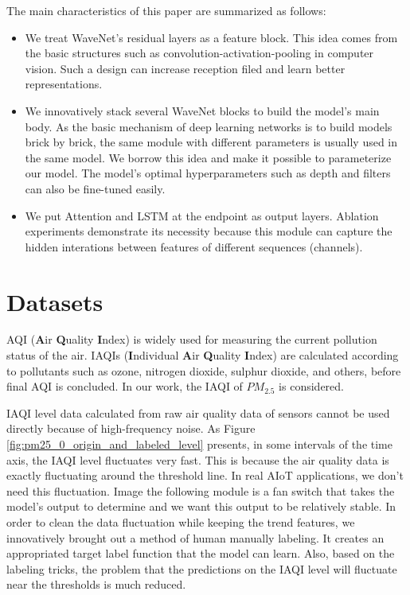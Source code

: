 \documentclass[sigconf]{acmart}
\begin{document}
The main characteristics of this paper are summarized as follows:
\begin{itemize}
\item We treat WaveNet's residual layers as a feature block. This idea comes from the basic structures such as convolution-activation-pooling in computer vision. Such a design can increase reception filed and learn better representations.
\item We innovatively stack several WaveNet blocks to build the model's main body. As the basic mechanism of deep learning networks is to build models brick by brick, the same module with different parameters is usually used in the same model. We borrow this idea and make it possible to parameterize our model. The model's optimal hyperparameters such as depth and filters can also be fine-tuned easily.
\item We put Attention \cite{bahdanau2014neural} and LSTM \cite{hochreiter1997long} at the endpoint as output layers. Ablation experiments demonstrate its necessity because this module can capture the hidden interations between features of different sequences (channels).
\end{itemize}


\section{Datasets}\label{sec:data_modeling}

AQI (\textbf{A}ir \textbf{Q}uality \textbf{I}ndex) is widely used for measuring the current pollution status of the air. IAQIs (\textbf{I}ndividual \textbf{A}ir \textbf{Q}uality \textbf{I}ndex) are calculated according to pollutants such as ozone, nitrogen dioxide, sulphur dioxide, and others, before final AQI is concluded. In our work, the IAQI of $PM_{2.5}$ is considered.

IAQI level data calculated from raw air quality data of sensors cannot be used directly because of high-frequency noise. As Figure \ref{fig:pm25_0_origin_and_labeled_level} presents, in some intervals of the time axis, the IAQI level fluctuates very fast. This is because the air quality data is exactly fluctuating around the threshold line. In real AIoT applications, we don't need this fluctuation. Image the following module is a fan switch that takes the model's output to determine and we want this output to be relatively stable. In order to clean the data fluctuation while keeping the trend features, we innovatively brought out a method of human manually labeling. It creates an appropriated target label function that the model can learn. Also, based on the labeling tricks, the problem that the predictions on the IAQI level will fluctuate near the thresholds is much reduced.
\end{document}

